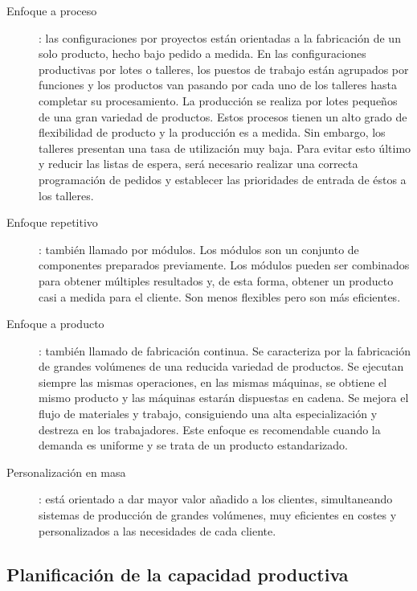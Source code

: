 \documentclass[10pt,a4paper,spanish]{report}
\begin{document}
                  \begin{description}
                        \item[Enfoque a proceso]: las configuraciones por proyectos están orientadas a la fabricación de un solo producto, hecho bajo pedido a medida. En las configuraciones productivas por lotes o talleres, los puestos de trabajo están agrupados por funciones y los productos van pasando por cada uno de los talleres hasta completar su procesamiento. La producción se realiza por lotes pequeños de una gran variedad de productos. Estos procesos tienen un alto grado de flexibilidad de producto y la producción es a medida. Sin embargo, los talleres presentan una tasa de utilización muy baja. Para evitar esto último y reducir las listas de espera, será necesario realizar una correcta programación de pedidos y establecer las prioridades de entrada de éstos a los talleres.

                        \item[Enfoque repetitivo]: también llamado por módulos. Los módulos son un conjunto de componentes preparados previamente. Los módulos pueden ser combinados para obtener múltiples resultados y, de esta forma, obtener un producto casi a medida para el cliente. Son menos flexibles pero son más eficientes.

                        \item[Enfoque a producto]: también llamado de fabricación continua. Se caracteriza por la fabricación de grandes volúmenes de una reducida variedad de productos. Se ejecutan siempre las mismas operaciones, en las mismas máquinas, se obtiene el mismo producto y las máquinas estarán dispuestas en cadena. Se mejora el flujo de materiales y trabajo, consiguiendo una alta especialización y destreza en los trabajadores. Este enfoque es recomendable cuando la demanda es uniforme y se trata de un producto estandarizado.

                        \item[Personalización en masa]: está orientado a dar mayor valor añadido a los clientes, simultaneando sistemas de producción de grandes volúmenes, muy eficientes en costes y personalizados a las necesidades de cada cliente.
                  \end{description}

            \subsection{\textcolor[rgb]{0.9,0.7,0.6}Planificación de la capacidad productiva}
\end{document}
